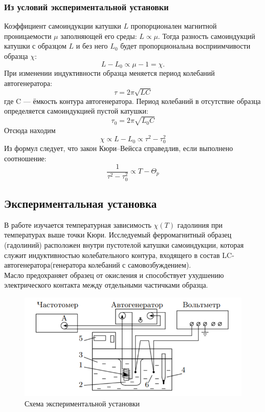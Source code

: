 \documentclass[a4paper]{article}
\begin{document}
\subsubsection{Из условий экспериментальной установки}
Коэффициент самоиндукции катушки $L$ пропорционален магнитной проницаемости $\mu$ заполняющей его среды: $L \propto \mu$. Тогда разность самоиндукций катушки с образцом $L$ и без него $L_0$ будет пропорциональна восприимчивости образца $\chi$:
\begin{equation}\label{}
L-L_0 \propto \mu - 1 = \chi.
\end{equation}
При изменении индуктивности образца меняется период колебаний автогенератора:
\begin{equation}\label{}
\tau = 2\pi \sqrt{LC}
\end{equation}
где C --- ёмкость контура автогенератора. Период колебаний в отсутствие образца определяется самоиндукцией пустой катушки:
\begin{equation}\label{}
\tau_0 = 2\pi \sqrt{L_0 C}
\end{equation}
Отсюда находим
\begin{equation}\label{}
\chi \propto L-L_0 \propto \tau^2 - \tau_0^2
\end{equation}
Из формул следует, что закон Кюри–Вейсса справедлив, если выполнено соотношение:
\begin{equation}\label{}
\dfrac{1}{\tau^2  - \tau_0^2} \propto T - \Theta_p
\end{equation}


	\subsection{Экспериментальная установка}
	В работе изучается температурная зависимость $\chi(T)$ гадолиния при температурах выше точки Кюри. Исследуемый ферромагнитный образец (гадолиний) расположен внутри пустотелой катушки самоиндукции, которая служит индуктивностью колебательного контура, входящего в состав LC-автогенератора(генератора колебаний с самовозбуждением). \\
	 Масло предохраняет образец от окисления и способствует ухудшению электрического контакта между отдельными частичками образца.
        \begin{figure}[H]
		\centering
		\includegraphics[width=13cm]{theory2.png}
		\caption{Схема экспериментальной установки}
	\end{figure}  
\end{document}
